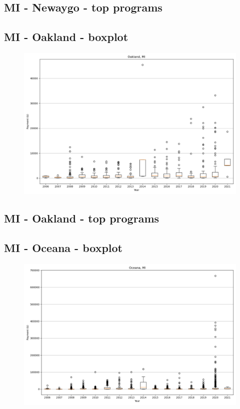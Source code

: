 \subsection*{MI - Newaygo - top programs}

\newpage
\subsection*{MI - Oakland - boxplot}
\begin{figure}[h]
\centering
\includegraphics[width=7in]{../output/boxplots/counties/Oakland-MI_boxplot.png}
\end{figure}


\subsection*{MI - Oakland - top programs}

\newpage
\subsection*{MI - Oceana - boxplot}
\begin{figure}[h]
\centering
\includegraphics[width=7in]{../output/boxplots/counties/Oceana-MI_boxplot.png}
\end{figure}


